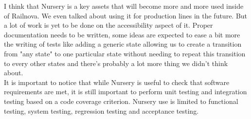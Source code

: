 \documentclass[12pt]{article}
\theoremstyle{definition}
\theoremstyle{definition}
\theoremstyle{remark}
\begin{document}
I think that Nursery is a key assets that will become more and more used inside of Railnova. We even talked about using it for production lines in the future. But a lot of work is yet to be done on the accessibility aspect of it. Proper documentation needs to be written, some ideas are expected to ease a bit more the writing of tests like adding a generic state allowing us to create a transition from "any state" to one particular state without needing to repeat this transition to every other states and there's probably a lot more thing we didn't think about.\\

It is important to notice that while Nursery is useful to check that software requirements are met, it is still important to perform unit testing and integration testing based on a code coverage criterion. Nursery use is limited to functional testing, system testing, regression testing and acceptance testing.

\end{document}
